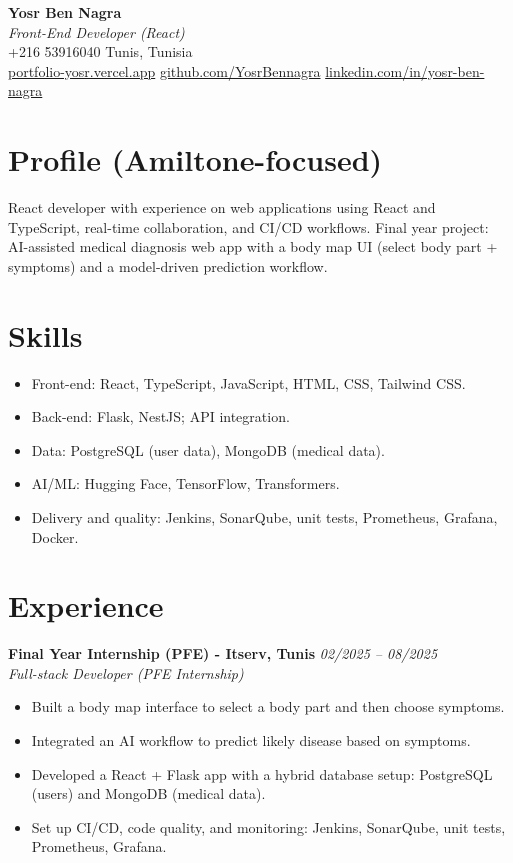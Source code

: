 \documentclass[10pt,a4paper]{article}
\begin{document}
\begin{center}
  {\LARGE\textbf{Yosr Ben Nagra}}\\
  \vspace{2pt}
  \textit{Front-End Developer (React)}\\
  \vspace{4pt}
  +216 53916040 \textbar{} Tunis, Tunisia\\
  \href{https://portfolio-yosr.vercel.app/en}{portfolio-yosr.vercel.app} \textbar{}
  \href{https://github.com/YosrBennagra}{github.com/YosrBennagra} \textbar{}
  \href{https://www.linkedin.com/in/yosr-ben-nagra/}{linkedin.com/in/yosr-ben-nagra}
\end{center}

\vspace{-4pt}
\section*{Profile (Amiltone-focused)}
React developer with experience on web applications using React and TypeScript, real-time collaboration, and CI/CD workflows. Final year project: AI-assisted medical diagnosis web app with a body map UI (select body part + symptoms) and a model-driven prediction workflow.

\section*{Skills}
\begin{itemize}
  \item Front-end: React, TypeScript, JavaScript, HTML, CSS, Tailwind CSS.
  \item Back-end: Flask, NestJS; API integration.
  \item Data: PostgreSQL (user data), MongoDB (medical data).
  \item AI/ML: Hugging Face, TensorFlow, Transformers.
  \item Delivery and quality: Jenkins, SonarQube, unit tests, Prometheus, Grafana, Docker.
\end{itemize}

\section*{Experience}
\textbf{Final Year Internship (PFE) - Itserv, Tunis} \hfill \textit{02/2025 -- 08/2025}\\
\textit{Full-stack Developer (PFE Internship)}
\begin{itemize}
  \item Built a body map interface to select a body part and then choose symptoms.
  \item Integrated an AI workflow to predict likely disease based on symptoms.
  \item Developed a React + Flask app with a hybrid database setup: PostgreSQL (users) and MongoDB (medical data).
  \item Set up CI/CD, code quality, and monitoring: Jenkins, SonarQube, unit tests, Prometheus, Grafana.
\end{itemize}
\end{document}
